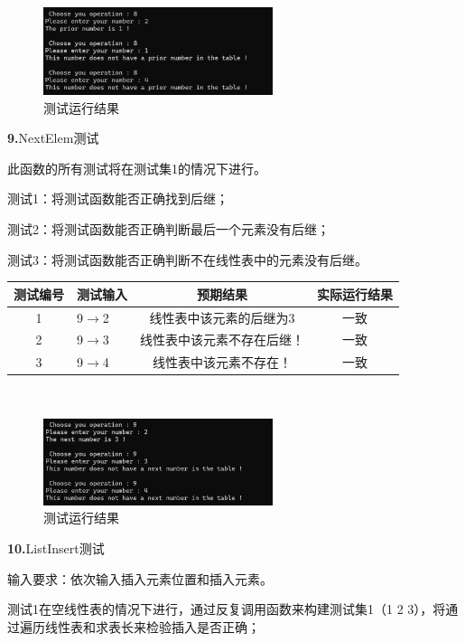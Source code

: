 \documentclass[supercite]{Experimental_Report}
\theoremstyle{definition}
\begin{document}
~\

 \begin{figure}[H]
 	\centering
 	\includegraphics[width=0.6\textwidth]{images/线性表测试8.png}
 	\caption{测试运行结果}
 	\label{txlab}
 \end{figure}


\noindent\textbf{ 9.}NextElem测试

    此函数的所有测试将在测试集1的情况下进行。

    测试1：将测试函数能否正确找到后继；

    测试2：将测试函数能否正确判断最后一个元素没有后继；

    测试3：将测试函数能否正确判断不在线性表中的元素没有后继。

\vspace{0.5em}

\begin{tabular}{|c|l|c|c|}
	\hline
	测试编号 & 测试输入 & 预期结果 & 实际运行结果 \\
	\hline
	1 & 9$\rightarrow$2 & 线性表中该元素的后继为3 & 一致 \\
	\hline
	2 & 9$\rightarrow$3 & 线性表中该元素不存在后继！ & 一致 \\
	\hline
	3 & 9$\rightarrow$4 & 线性表中该元素不存在！ & 一致 \\
	\hline
\end{tabular}

~\

 \begin{figure}[H]
 	\centering
 	\includegraphics[width=0.6\textwidth]{images/线性表测试9.png}
 	\caption{测试运行结果}
 	\label{txlab}
 \end{figure}


\noindent\textbf{10.}ListInsert测试

	输入要求：依次输入插入元素位置和插入元素。

	测试1在空线性表的情况下进行，通过反复调用函数来构建测试集1（1 2 3），将通过遍历线性表和求表长来检验插入是否正确；
\end{document}
